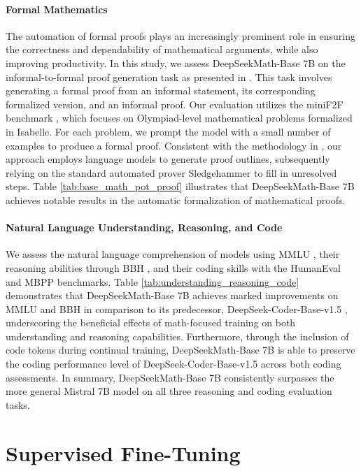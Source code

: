 \begin{itemize}[topsep=0pt]
\paragraph{Formal Mathematics}

The automation of formal proofs plays an increasingly prominent role in ensuring the correctness and dependability of mathematical arguments, while also improving productivity. In this study, we assess DeepSeekMath-Base 7B on the informal-to-formal proof generation task as presented in \citep{dsp_proof}. This task involves generating a formal proof from an informal statement, its corresponding formalized version, and an informal proof. Our evaluation utilizes the miniF2F benchmark \citep{minif2f}, which focuses on Olympiad-level mathematical problems formalized in Isabelle. For each problem, we prompt the model with a small number of examples to produce a formal proof. Consistent with the methodology in \cite{dsp_proof}, our approach employs language models to generate proof outlines, subsequently relying on the standard automated prover Sledgehammer \citep{sledgehammer} to fill in unresolved steps. Table \ref{tab:base_math_pot_proof} illustrates that DeepSeekMath-Base 7B achieves notable results in the automatic formalization of mathematical proofs.

\paragraph{Natural Language Understanding, Reasoning, and Code}

We assess the natural language comprehension of models using MMLU \citep{mmlu}, their reasoning abilities through BBH \citep{bbh}, and their coding skills with the HumanEval \citep{codex} and MBPP \citep{mbpp} benchmarks. Table \ref{tab:understanding_reasoning_code} demonstrates that DeepSeekMath-Base 7B achieves marked improvements on MMLU and BBH in comparison to its predecessor, DeepSeek-Coder-Base-v1.5 \citep{deepseek-coder}, underscoring the beneficial effects of math-focused training on both understanding and reasoning capabilities. Furthermore, through the inclusion of code tokens during continual training, DeepSeekMath-Base 7B is able to preserve the coding performance level of DeepSeek-Coder-Base-v1.5 across both coding assessments. In summary, DeepSeekMath-Base 7B consistently surpasses the more general Mistral 7B model \citep{mistral} on all three reasoning and coding evaluation tasks.

\section{Supervised Fine-Tuning}


\end{itemize}
